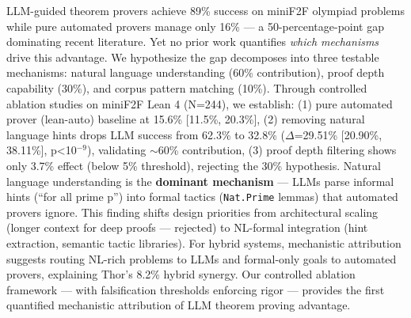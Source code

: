 LLM-guided theorem provers achieve 89\% success on miniF2F olympiad problems while pure automated provers manage only 16\% --- a 50-percentage-point gap dominating recent literature. Yet no prior work quantifies \emph{which mechanisms} drive this advantage. We hypothesize the gap decomposes into three testable mechanisms: natural language understanding (60\% contribution), proof depth capability (30\%), and corpus pattern matching (10\%). Through controlled ablation studies on miniF2F Lean 4 (N=244), we establish: (1) pure automated prover (lean-auto) baseline at 15.6\% [11.5\%, 20.3\%], (2) removing natural language hints drops LLM success from 62.3\% to 32.8\% ($\Delta$=29.51\% [20.90\%, 38.11\%], p<10$^{-9}$), validating $\sim$60\% contribution, (3) proof depth filtering shows only 3.7\% effect (below 5\% threshold), rejecting the 30\% hypothesis. Natural language understanding is the \textbf{dominant mechanism} --- LLMs parse informal hints (``for all prime p'') into formal tactics (\texttt{Nat.Prime} lemmas) that automated provers ignore. This finding shifts design priorities from architectural scaling (longer context for deep proofs --- rejected) to NL-formal integration (hint extraction, semantic tactic libraries). For hybrid systems, mechanistic attribution suggests routing NL-rich problems to LLMs and formal-only goals to automated provers, explaining Thor's 8.2\% hybrid synergy. Our controlled ablation framework --- with falsification thresholds enforcing rigor --- provides the first quantified mechanistic attribution of LLM theorem proving advantage.
